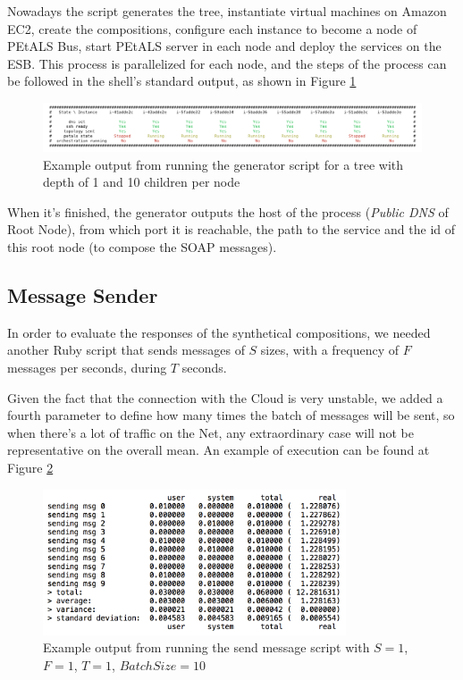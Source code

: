 Nowadays the script generates the tree, instantiate virtual machines on Amazon EC2, create the compositions, configure each instance to become a node of PEtALS Bus, start PEtALS server in each node and deploy the services on the ESB. This process is parallelized for each node, and the steps of the process can be followed in the shell's standard output, as shown in Figure \ref{generation-output}


\begin{figure}[htb]
	\centering
	\includegraphics[trim= 10mm 0mm 10mm 0mm, clip, width=\textwidth]{images/generation-output}
	\caption{Example output from running the generator script for a tree with depth of 1 and 10 children per node}
	\label{generation-output}
\end{figure}

When it's finished, the generator outputs the host of the process (\emph{Public DNS} of Root Node), from which port it is reachable, the path to the service and the id of this root node (to compose the SOAP messages).

\subsection{Message Sender}

In order to evaluate the responses of the synthetical compositions, we needed another Ruby script that sends messages of $S$ sizes, with a frequency of $F$ messages per seconds, during $T$ seconds.

Given the fact that the connection with the Cloud is very unstable, we added a fourth parameter to define how many times the batch of messages will be sent, so when there's a lot of traffic on the Net, any extraordinary case will not be representative on the overall mean. An example of execution can be found at Figure \ref{send-msg-output}


\begin{figure}[htb]
	\centering
	\includegraphics[width=0.8\textwidth]{images/send-msg-output}
	\caption{Example output from running the send message script with $S = 1$, $F = 1$, $T = 1$, $BatchSize = 10$}
	\label{send-msg-output}
\end{figure}
